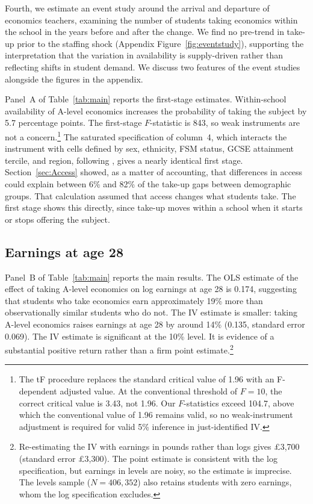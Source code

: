 Fourth, we estimate an event study around the arrival and departure of economics teachers, examining the number of students taking economics within the school in the years before and after the change. We find no pre-trend in take-up prior to the staffing shock (Appendix Figure~\ref{fig:eventstudy}), supporting the interpretation that the variation in availability is supply-driven rather than reflecting shifts in student demand. We discuss two features of the event studies alongside the figures in the appendix.


Panel~A of Table~\ref{tab:main} reports the first-stage estimates. Within-school availability of A-level economics increases the probability of taking the subject by 5.7 percentage points. The first-stage $F$-statistic is 843, so weak instruments are not a concern.\footnote{The \citet{lee2022valid} tF procedure replaces the standard critical value of 1.96 with an F-dependent adjusted value. At the conventional threshold of $F = 10$, the correct critical value is 3.43, not 1.96. Our $F$-statistics exceed 104.7, above which the conventional value of 1.96 remains valid, so no weak-instrument adjustment is required for valid 5\% inference in just-identified IV.} The saturated specification of column~4, which interacts the instrument with cells defined by sex, ethnicity, FSM status, GCSE attainment tercile, and region, following \citet{blandhol2022tsls}, gives a nearly identical first stage. Section~\ref{sec:Access} showed, as a matter of accounting, that differences in access could explain between 6\% and 82\% of the take-up gaps between demographic groups. That calculation assumed that access changes what students take. The first stage shows this directly, since take-up moves within a school when it starts or stops offering the subject.

\subsection{Earnings at age 28}
\label{sec:earnings28}

Panel~B of Table~\ref{tab:main} reports the main results. The OLS estimate of the effect of taking A-level economics on log earnings at age 28 is 0.174, suggesting that students who take economics earn approximately 19\% more than observationally similar students who do not. The IV estimate is smaller: taking A-level economics raises earnings at age 28 by around 14\% (0.135, standard error 0.069). The IV estimate is significant at the 10\% level. It is evidence of a substantial positive return rather than a firm point estimate.\footnote{Re-estimating the IV with earnings in pounds rather than logs gives \pounds 3,700 (standard error \pounds 3,300). The point estimate is consistent with the log specification, but earnings in levels are noisy, so the estimate is imprecise. The levels sample ($N = 406{,}352$) also retains students with zero earnings, whom the log specification excludes.}

